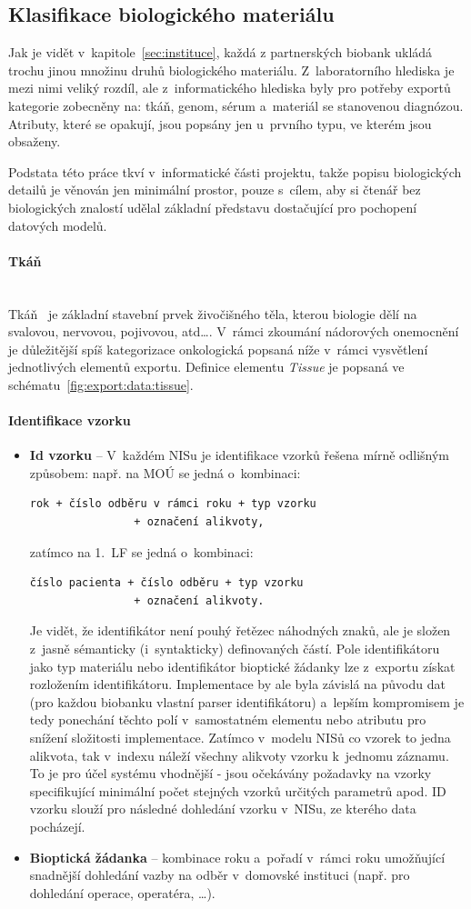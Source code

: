 \documentclass[11pt,draft,oneside]{fithesis2}
\newcommand{\polozka}[1]{\item {\bf #1}\xspace}
\newcommand{\paragraphNewLine}[1]{\paragraph*{#1}\mbox{}\\}
\begin{document}
\subsection{Klasifikace biologického materiálu}\label{chapter:analysis:subsection:index}
Jak je vidět v~kapitole~\ref{sec:instituce}, každá z partnerských biobank ukládá trochu jinou množinu druhů biologického materiálu. Z~laboratorního hlediska je mezi nimi veliký rozdíl, ale z~informatického hlediska byly pro potřeby exportů kategorie zobecněny na: tkáň, genom, sérum a~materiál se stanovenou diagnózou. Atributy, které se opakují, jsou popsány jen u~prvního typu, ve kterém jsou obsaženy.

Podstata této práce tkví v~informatické části projektu, takže popisu biologických detailů je věnován jen minimální prostor, pouze s~cílem, aby si čtenář bez biologických znalostí udělal základní představu dostačující pro pochopení datových modelů.

\paragraphNewLine{Tkáň}
Tkáň~\cite{anatomie} je základní stavební prvek živočišného těla, kterou biologie dělí na svalovou, nervovou, pojivovou, atd\ldots . V~rámci zkoumání nádorových onemocnění je důležitější spíš kategorizace onkologická popsaná níže v~rámci vysvětlení jednotlivých elementů exportu.
Definice elementu \textit{Tissue} je popsaná ve schématu~\ref{fig:export:data:tissue}.

\paragraph*{Identifikace vzorku}
			\begin{itemize}
				\polozka{Id vzorku} -- V~každém NISu je identifikace vzorků řešena mírně odlišným způsobem: např. na MOÚ se jedná o~kombinaci:
				\begin{verbatim}rok + číslo odběru v rámci roku + typ vzorku 
				+ označení alikvoty,\end{verbatim}zatímco na 1.~LF se jedná o~kombinaci:
				\begin{verbatim}číslo pacienta + číslo odběru + typ vzorku 
				+ označení alikvoty.\end{verbatim}Je vidět, že identifikátor není pouhý řetězec náhodných znaků, ale je složen z~jasně sémanticky (i~syntakticky) definovaných částí. Pole identifikátoru jako typ materiálu nebo identifikátor bioptické žádanky lze z~exportu získat rozložením identifikátoru. Implementace by ale byla závislá na původu dat (pro každou biobanku vlastní parser identifikátoru) a~lepším kompromisem je tedy ponechání těchto polí v~samostatném elementu nebo atributu pro snížení složitosti implementace.
				Zatímco v~modelu NISů co vzorek to jedna alikvota, tak v~indexu náleží všechny alikvoty vzorku k~jednomu záznamu. To je pro účel systému vhodnější - jsou očekávány požadavky na vzorky specifikující minimální počet stejných vzorků určitých parametrů apod.
				ID vzorku slouží pro následné dohledání vzorku v~NISu, ze kterého data pocházejí.
				\polozka{Bioptická žádanka} -- kombinace roku a~pořadí v~rámci roku umožňující snadnější dohledání vazby na odběr v~domovské instituci (např. pro dohledání operace, operatéra, \dots).
			\end{itemize}			
\end{document}
